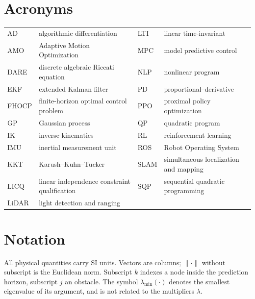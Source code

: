 \documentclass[11pt,a4paper]{article}
\begin{document}


\newpage
\tableofcontents
\vspace{10pt}

\newpage
\section*{Acronyms}

\noindent\begin{tabularx}{\textwidth}{@{}lX@{\hspace{1.2em}}lX@{}}
AD    & algorithmic differentiation      & LTI   & linear time-invariant \\
AMO   & Adaptive Motion Optimization     & MPC   & model predictive control \\
DARE  & discrete algebraic Riccati equation & NLP & nonlinear program \\
EKF   & extended Kalman filter           & PD    & proportional--derivative \\
FHOCP & finite-horizon optimal control problem & PPO & proximal policy optimization \\
GP    & Gaussian process                 & QP    & quadratic program \\
IK    & inverse kinematics               & RL    & reinforcement learning \\
IMU   & inertial measurement unit        & ROS   & Robot Operating System \\
KKT   & Karush--Kuhn--Tucker             & SLAM  & simultaneous localization and mapping \\
LICQ  & linear independence constraint qualification & SQP & sequential quadratic programming \\
LiDAR & light detection and ranging      &       & \\
\end{tabularx}

\section*{Notation}

\noindent All physical quantities carry SI units. Vectors are columns; $\|\cdot\|$ without
subscript is the Euclidean norm. Subscript $k$ indexes a node inside the prediction horizon,
subscript $j$ an obstacle. The symbol $\lambda_{\min}(\cdot)$ denotes the smallest eigenvalue of its
argument, and is not related to the multipliers $\lambda$.
\end{document}
